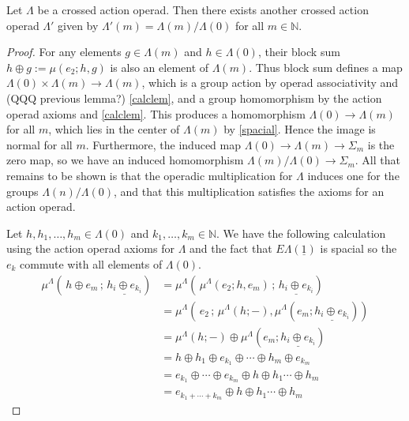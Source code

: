 \documentclass{amsbook} %
\newcommand{\EL}{E\Lambda}
\numberwithin{section}{chapter}
\begin{document}
\begin{prop} \label{G0quot} Let $\Lambda$ be a crossed action operad. Then there exists another crossed action operad $\Lambda'$ given by $\Lambda'(m) = \Lambda(m)/\Lambda(0)$ for all $m \in \mathbb{N}$.
\end{prop}
\begin{proof}
For any elements $g \in \Lambda(m)$ and $h \in \Lambda(0)$, their block sum $h \oplus g := \mu(e_2; h, g)$ is also an element of $\Lambda(m)$. Thus block sum defines a map $\Lambda(0) \times \Lambda(m) \rightarrow \Lambda(m)$, which is a group action by operad associativity and (QQQ previous lemma?) \cref{calclem}, and a group homomorphism by the action operad axioms and \cref{calclem}. This produces a homomorphism $\Lambda(0) \rightarrow \Lambda(m)$ for all $m$, which lies in the center of $\Lambda(m)$ by \cref{spacial}. Hence the image is normal for all $m$. Furthermore, the induced map $\Lambda(0) \rightarrow \Lambda(m) \rightarrow \Sigma_m$ is the zero map, so we have an induced homomorphism $\Lambda(m)/\Lambda(0) \rightarrow \Sigma_m$. All that remains to be shown is that the operadic multiplication for $\Lambda$ induces one for the groups $\Lambda(n)/\Lambda(0)$, and that this multiplication satisfies the axioms for an action operad.

Let $h, h_1, \ldots, h_m \in \Lambda(0)$ and $k_1, \ldots, k_m \in \mathbb{N}$. We have the following calculation using the action operad axioms for $\Lambda$ and the fact that $\EL(\underline{1})$ is spacial so the $e_k$ commute with all elements of $\Lambda(0)$.
\begin{align*}
		\mu^{\Lambda}\left( \, h \oplus e_m \, ; \, \underline{h_i \oplus e_{k_i}}\right) &= \mu^{\Lambda}\left( \, \mu^{\Lambda}(e_2; h, e_m) \, ; \, \underline{h_i \oplus e_{k_i}} \right) \\
		&= \mu^{\Lambda}\left( \, e_2 \, ; \, \mu^{\Lambda}(h;-), \mu^{\Lambda}(e_m; \underline{h_i \oplus e_{k_i}}) \right) \\
		&= \mu^{\Lambda}(h;-)\oplus \mu^{\Lambda}\left(e_m; \underline{h_i \oplus e_{k_i}}\right) \\
		&= h \oplus h_1 \oplus e_{k_1} \oplus \cdots \oplus h_m \oplus e_{k_m} \\
		&= e_{k_1} \oplus \cdots \oplus e_{k_m} \oplus h \oplus h_1 \cdots \oplus h_m \\
		&= e_{k_1+\cdots+k_m} \oplus h \oplus h_1 \cdots \oplus h_m
\end{align*}


\end{proof}
\end{document}
